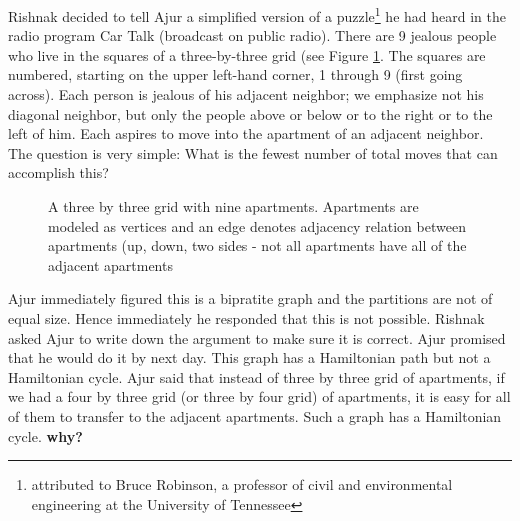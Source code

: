 Rishnak decided to tell Ajur a simplified version of a puzzle\footnote{attributed to Bruce Robinson, a professor of civil and environmental engineering at the University of Tennessee} he had heard in the radio program Car Talk (broadcast on public radio). There are 9 jealous people who live in the squares of a three-by-three grid (see Figure \ref{5g7}. The squares are numbered, starting on the upper left-hand corner, 1 through 9 (first going across). Each person is jealous of his adjacent neighbor; we emphasize not his diagonal neighbor, but only the people above or below or to the right or to the left of him. Each aspires to move into the apartment of an adjacent neighbor.
The question is very simple: What is the fewest number of total moves that can accomplish this?
\begin{figure}
\begin{center}
\caption{ A three by three grid with nine apartments. Apartments are modeled as vertices and an edge denotes adjacency relation between apartments (up, down, two sides - not all apartments have all of the adjacent apartments} \label{5g7}
\end{center}
\end{figure}

Ajur immediately figured  this is a bipratite graph and the partitions are not of equal size. Hence immediately he responded that this is not possible. Rishnak asked Ajur to write down the argument to make sure it is correct. Ajur promised that he would do it by next day. This graph has a Hamiltonian path but not a Hamiltonian cycle. Ajur said that instead of three by three grid of apartments, if we had a four by three grid (or three by four grid) of apartments, it is easy for all of them to transfer to the adjacent apartments. Such a graph has a Hamiltonian cycle. \textbf{why?}

